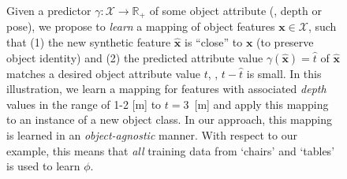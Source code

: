 \documentclass[10pt,twocolumn,letterpaper]{article}
\begin{document}
\begin{figure}[t!]
\caption{\label{fig:intro} Given a predictor $\gamma: \mathcal{X} \to \mathbb{R}_+$
of some object attribute (\eg, depth or pose), we propose to \emph{learn} a mapping 
of object features $\mathbf{x} \in \mathcal{X}$, such that
(1) the new synthetic feature $\hat{\mathbf{x}}$ is ``close'' 
to $\mathbf{x}$ (to preserve object identity) and (2) the predicted 
attribute value $\gamma(\hat{\mathbf{x}}) = \hat{t}$ of $\hat{\mathbf{x}}$
matches a desired object attribute value $t$, \ie, $t-\hat{t}$ is small. In this illustration,
we learn a mapping for features with associated \emph{depth} values in the
range of 1-2 [m] to $t=3$~[m] and apply this mapping to an instance of a new 
object class. In our approach, this mapping is learned in 
an \emph{object-agnostic} manner. With respect to our example, this means that
\emph{all} training data from `chairs' and `tables' is used to learn $\phi$.}
\end{figure}
\end{document}
